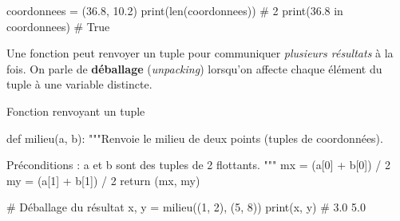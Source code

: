 
\begin{python}
coordonnees = (36.8, 10.2)
print(len(coordonnees))      # 2
print(36.8 in coordonnees)   # True
\end{python}


\begin{nxdef}[D3]
  Une fonction peut renvoyer un tuple pour communiquer \emph{plusieurs résultats} à la fois.
  On parle de \textbf{déballage} (\emph{unpacking}) lorsqu'on affecte chaque élément du tuple
  à une variable distincte.
\end{nxdef}

\begin{codereference}{Fonction renvoyant un tuple}
\begin{python}
def milieu(a, b):
    """Renvoie le milieu de deux points (tuples de coordonnées).

    Préconditions : a et b sont des tuples de 2 flottants.
    """
    mx = (a[0] + b[0]) / 2
    my = (a[1] + b[1]) / 2
    return (mx, my)

# Déballage du résultat
x, y = milieu((1, 2), (5, 8))
print(x, y)  # 3.0 5.0
\end{python}
\end{codereference}




